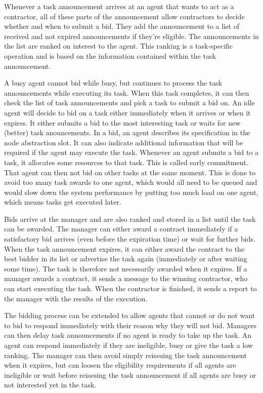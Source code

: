\documentclass[10pt,a4paper]{article}
\begin{document}
Whenever a task announcement arrives at an agent that wants to act as a contractor, all of these parts of the announcement allow contractors to decide whether and when to submit a bid. They add the announcement to a list of received and not expired announcements if they're eligible. The announcements in the list are ranked on interest to the agent. This ranking is a task-specific operation and is based on the information contained within the task announcement.

A busy agent cannot bid while busy, but continues to process the task announcements while executing its task. When this task completes, it can then check the list of task announcements and pick a task to submit a bid on. An idle agent will decide to bid on a task either immediately when it arrives or when it expires. It either submits a bid to the most interesting task or waits for new (better) task anouncements. In a bid, an agent describes its specification in the node abstraction slot. It can also indicate additional information that will be required if the agent may execute the task. Whenever an agent submits a bid to a task, it allocates some resources to that task. This is called early commitment. That agent can then not bid on other tasks at the same moment. This is done to avoid too many task awards to one agent, which would all need to be queued and would slow down the system performance by putting too much load on one agent, which means tasks get executed later.

Bids arrive at the manager and are also ranked and stored in a list until the task can be awarded. The manager can either award a contract immediately if a satisfactory bid arrives (even before the expiration time) or wait for further bids. When the task announcement expires, it can either award the contract to the best bidder in its list or advertise the task again (immediately or after waiting some time). The task is therefore not necessarily awarded when it expires. If a manager awards a contract, it sends a message to the winning contractor, who can start executing the task. When the contractor is finished, it sends a report to the manager with the results of the execution.

The bidding process can be extended to allow agents that cannot or do not want to bid to respond immediately with their reason why they will not bid. Managers can then delay task announcements if no agent is ready to take up the task. An agent can respond immediately if they are ineligible, busy or give the task a low ranking. The manager can then avoid simply reissuing the task announcement when it expires, but can loosen the eligibility requirements if all agents are ineligible or wait before reissuing the task announcement if all agents are busy or not interested yet in the task.
\end{document}
